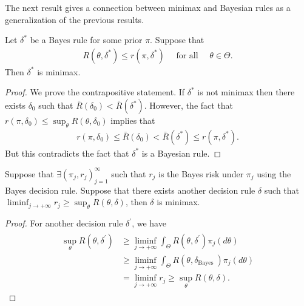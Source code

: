 The next result gives a connection between minimax and Bayesian rules as a generalization of the previous results.
\begin{thm}
    Let $\delta^*$ be a Bayes rule for some prior $\pi$. Suppose that
\begin{align*}
R\left(\theta, \delta^*\right) \leq r\left(\pi, \delta^*\right) \quad \text { for all } \quad \theta \in \Theta .
\end{align*}
Then $\delta^*$ is minimax.
\end{thm}

\begin{proof}
    We prove the contrapositive statement. If $\delta^*$ is not minimax then there exists $\delta_0$ such that $\bar{R}\left(\delta_0\right)<\bar{R}\left(\delta^*\right)$. However, the fact that $r\left(\pi, \delta_0\right) \leq \sup _\theta R\left(\theta, \delta_0\right)$ implies that
\begin{align*}
r\left(\pi, \delta_0\right) \leq \bar{R}\left(\delta_0\right)<\bar{R}\left(\delta^*\right) \leq r\left(\pi, \delta^*\right) .
\end{align*}
But this contradicts the fact that $\delta^*$ is a Bayesian rule.
\end{proof}

\begin{prop}
    Suppose that $\exists\left(\pi_j, r_j\right)_{j=1}^{\infty}$ such that $r_j$ is the Bayes risk under $\pi_j$ using the Bayes decision rule. Suppose that there exists another decision rule $\delta$ such that $\liminf _{j\rightarrow+\infty} r_j \geq \sup _\theta R(\theta, \delta)$, then $\delta$ is minimax.
\end{prop}

\begin{proof}
    For another decision rule $\delta^{\prime}$, we have
\begin{align*}
\begin{aligned}
\sup _\theta R\left(\theta, \delta^{\prime}\right) & \geq\liminf _{j \rightarrow+\infty} \int_{\Theta} R\left(\theta, \delta^{\prime}\right) \pi_j(d \theta) \\
& \geq \liminf _{j \rightarrow+\infty} \int_{\Theta} R\left(\theta, \delta_{\text {Bayes }}\right) \pi_j(d \theta) \\
& =\liminf _{j \rightarrow+\infty} r_j \geq \sup_\theta R(\theta, \delta) .
\end{aligned}
\end{align*}
\end{proof}

